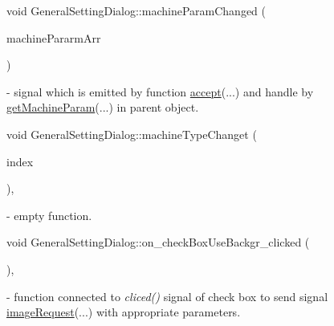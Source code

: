 \mbox{\label{classGeneralSettingDialog_a02019fb6d81fc0e83ed6ae0ef7ef68b4}} 
{\footnotesize\ttfamily void General\+Setting\+Dialog\+::\texorpdfstring{machine\+Param\+Changed}{machineParamChanged} (\begin{DoxyParamCaption}\item[{Q\+Byte\+Array}]{machine\+Pararm\+Arr }\end{DoxyParamCaption}){\ttfamily [signal]}} - signal which is emitted by function \hyperlink{classGeneralSettingDialog_a8f189ce9494b6c5488f8a2be4c792f6a}{accept}(...) and handle by \hyperlink{classMainWindow_a2dc63192aa7ff54dfc64e8308712c287}{get\+Machine\+Param}(...) in parent object.

\mbox{\label{classGeneralSettingDialog_a30243bd5ab4a0e2016b8a481504ccb62}} 
{\footnotesize\ttfamily void General\+Setting\+Dialog\+::\texorpdfstring{machine\+Type\+Changet}{machineTypeChanget} (\begin{DoxyParamCaption}\item[{int}]{index }\end{DoxyParamCaption}){\ttfamily [private]}, {\ttfamily [slot]}} - empty function. 

\mbox{\label{classGeneralSettingDialog_a2fbe72c63737ff21b4780013a0cbe35a}} 
{\footnotesize\ttfamily void General\+Setting\+Dialog\+::\texorpdfstring{on\+\_\+check\+Box\+Use\+Backgr\+\_\+clicked}{on\_checkBoxUseBackgr\_clicked} (\begin{DoxyParamCaption}{ }\end{DoxyParamCaption}){\ttfamily [private]}, {\ttfamily [slot]}} - function connected to \textit{cliced()} signal of check box to send signal \hyperlink{classGeneralSettingDialog_a1c6ff8e8d7b1ad5f4399942ea48dc9d8}{image\+Request}(...) with appropriate parameters.

